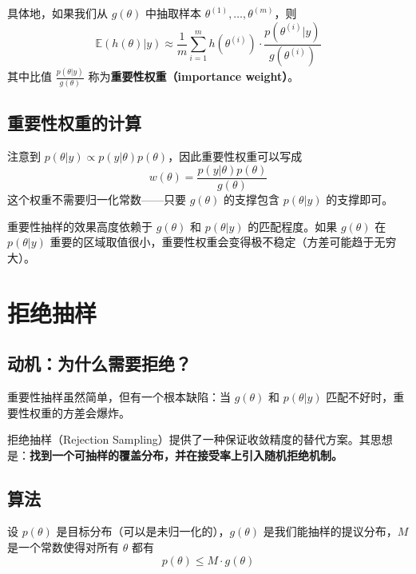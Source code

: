 具体地，如果我们从 $g(\theta)$ 中抽取样本 $\theta^{(1)}, \ldots, \theta^{(m)}$，则
\begin{equation}\label{eq:is-estimate}
\mathbb{E}(h(\theta) | y) \approx \frac{1}{m} \sum_{i=1}^{m} h(\theta^{(i)}) \cdot \frac{p(\theta^{(i)} | y)}{g(\theta^{(i)})}
\end{equation}
其中比值 $\frac{p(\theta | y)}{g(\theta)}$ 称为\textbf{重要性权重（importance weight）}。

\subsection{重要性权重的计算}

注意到 $p(\theta | y) \propto p(y | \theta) p(\theta)$，因此重要性权重可以写成
\begin{equation}\label{eq:importance-weight}
w(\theta) = \frac{p(y | \theta) p(\theta)}{g(\theta)}
\end{equation}
这个权重不需要归一化常数——只要 $g(\theta)$ 的支撑包含 $p(\theta | y)$ 的支撑即可。

\begin{Remark}
  重要性抽样的效果高度依赖于 $g(\theta)$ 和 $p(\theta | y)$ 的匹配程度。如果 $g(\theta)$ 在 $p(\theta | y)$ 重要的区域取值很小，重要性权重会变得极不稳定（方差可能趋于无穷大）。
\end{Remark}

\section{拒绝抽样}

\subsection{动机：为什么需要拒绝？}

重要性抽样虽然简单，但有一个根本缺陷：当 $g(\theta)$ 和 $p(\theta | y)$ 匹配不好时，重要性权重的方差会爆炸。

拒绝抽样（Rejection Sampling）提供了一种保证收敛精度的替代方案。其思想是：\textbf{找到一个可抽样的覆盖分布，并在接受率上引入随机拒绝机制。}

\subsection{算法}

设 $p(\theta)$ 是目标分布（可以是未归一化的），$g(\theta)$ 是我们能抽样的提议分布，$M$ 是一个常数使得对所有 $\theta$ 都有
\begin{equation}\label{eq:coverage-condition}
p(\theta) \leq M \cdot g(\theta)
\end{equation}

